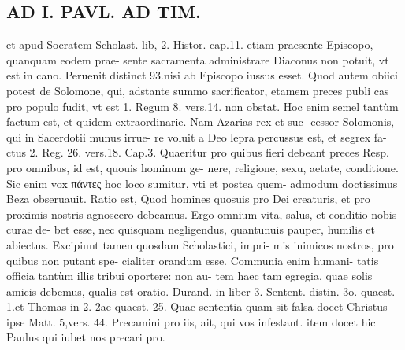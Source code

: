 \documentclass{article}
\begin{document}
\begin{pages}
\section*{AD I. PAVL. AD TIM. }
\marginpar{[ p.44 ]}\pstart et apud Socratem Scholast. lib, 2. Histor. cap.11. etiam praesente Episcopo, quanquam eodem prae- sente sacramenta administrare Diaconus non potuit, vt est in cano. Peruenit distinct 93.nisi ab Episcopo iussus esset.  \pend\pstart Quod autem obiici potest de Solomone, qui, adstante summo sacrificator, etamem preces publi cas pro populo fudit, vt est 1. Regum 8. vers.14. non obstat. Hoc enim semel tantùm factum est, et quidem extraordinarie. Nam Azarias rex et suc- cessor Solomonis, qui in Sacerdotii munus irrue- re voluit a Deo lepra percussus est, et segrex fa- ctus 2. Reg. 26. vers.18.  \pend\pstart Cap.3. Quaeritur pro quibus fieri debeant preces Resp. pro omnibus, id est, quouis hominum ge- nere, religione, sexu, aetate, conditione. Sic enim vox πάντες hoc loco sumitur, vti et postea quem- admodum doctissimus Beza obseruauit. Ratio est, Quod homines quosuis pro Dei creaturis, et pro proximis nostris agnoscero debeamus. Ergo omnium vita, salus, et conditio nobis curae de- bet esse, nec quisquam negligendus, quantunuis pauper, humilis et abiectus.  \pend\pstart Excipiunt tamen quosdam Scholastici, impri- mis inimicos nostros, pro quibus non putant spe- cialiter orandum esse. Communia enim humani- tatis officia tantùm illis tribui oportere: non au- tem haec tam egregia, quae solis amicis debemus, qualis est oratio. Durand. in liber 3. Sentent. distin. 3o. quaest. 1.et Thomas in 2. 2ae quaest. 25. Quae sententia quam sit falsa docet Christus ipse Matt. 5,vers. 44. Precamini pro iis, ait, qui vos infestant. item docet hic Paulus qui iubet nos precari pro.  \pend

\end{pages}
\end{document}
